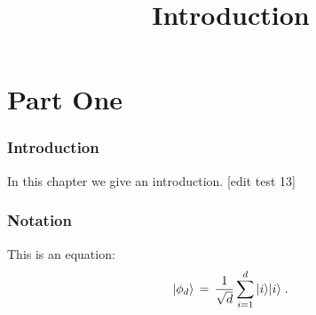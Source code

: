 

%


\title{Introduction}
\label{introduction}


\maketitle


\tableofcontents

\part{Part One}
\label{book-part-one}

\section{Introduction}
\label{section:introduction}

In this chapter we give an introduction. [edit test 13]

\section{Notation}
\label{section-notation}

This is an equation:
\begin{equation}
\label{eq:me-state}
 |\phi_d\rangle \,=\,\frac{1}{\sqrt{d}} \sum_{i=1}^d |i\rangle|i\rangle\;.
\end{equation}








